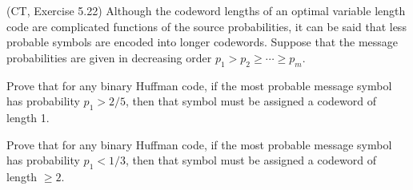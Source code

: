 \documentclass[a4paper,10pt,landscape,twocolumn]{scrartcl}
\begin{document}
\begin{exercise}
(CT, Exercise 5.22) Although the codeword lengths of an optimal variable length code are complicated functions of the source probabilities, it can be said that less probable symbols are encoded into longer codewords. Suppose that the message probabilities are given in decreasing order $p_1 > p_2 \geq \cdots \geq p_m$.
	\begin{subex}
	Prove that for any binary Huffman code, if the most probable message symbol has probability $p_1 > 2/5$, then that symbol must be assigned a codeword of length 1.
	\end{subex}
	\begin{subex}
	Prove that for any binary Huffman code, if the most probable message symbol has probability $p_1 < 1/3$, then that symbol must be assigned a codeword of length $\geq 2$.
	\end{subex}
\end{exercise}
\end{document}
